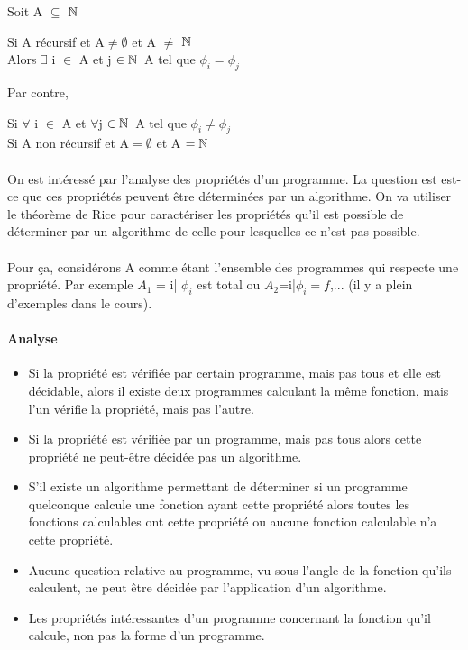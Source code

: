 Soit A $\subseteq$ $\mathbb{N}$ \\

\begin{mytheo}
	Si A récursif et A$\neq \emptyset$ et A $\neq$ $\mathbb{N}$ \\
	Alors $\exists$ i $\in$ A et j $\in \mathbb{N}$\ A tel que $\phi _i = \phi _j$
\end{mytheo}

Par contre,

\begin{mytheo}
	Si $\forall$ i $\in$ A et $\forall$j $\in \mathbb{N}$\ A tel que $\phi_i \neq 
	\phi_j$ \\
	Si A non récursif et A$=\emptyset$ et A $= \mathbb{N}$
\end{mytheo}

\paragraph{} On est intéressé par l'analyse des propriétés d'un programme. La 
question est est-ce que ces propriétés peuvent être déterminées par un 
algorithme. On va utiliser le théorème de Rice pour caractériser les propriétés 
qu'il est possible de déterminer par un algorithme de celle pour lesquelles ce 
n'est pas possible.

\paragraph{}Pour ça, considérons A comme étant l'ensemble des programmes qui 
respecte une propriété. Par exemple $A_1$ = {i| $\phi_i$ est total} ou 
$A_2$={i|$\phi_i = f$},... (il y a plein d'exemples dans le cours).

\paragraph{Analyse} 
\begin{itemize}
	\item Si la propriété est vérifiée par certain programme, mais pas tous 
		et elle est décidable, alors il existe deux programmes calculant la 
		même fonction, mais l'un vérifie la propriété, mais pas l'autre.

	\item Si la propriété est vérifiée par un programme, mais pas tous 
		alors cette propriété ne peut-être décidée pas un algorithme.

	\item S'il existe un algorithme permettant de déterminer si un 
		programme quelconque calcule une fonction ayant cette propriété 
		alors toutes les fonctions calculables ont cette propriété ou 
		aucune fonction calculable n'a cette propriété.
	\item Aucune question relative au programme, vu sous l'angle de la 
		fonction qu'ils calculent, ne peut être décidée par 
		l'application d'un algorithme.
	\item Les propriétés intéressantes d'un programme concernant la 
		fonction qu'il calcule, non pas la forme d'un programme.
\end{itemize}

